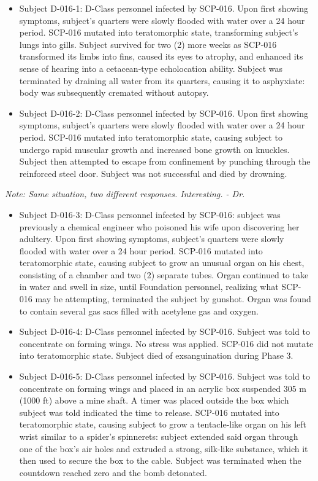 \begin{itemize}
\renewcommand{\labelitemi}{$\ast$}
\item Subject D-016-1: D-Class personnel infected by SCP-016. Upon first showing symptoms, subject's quarters were slowly flooded with water over a 24 hour period. SCP-016 mutated into teratomorphic state, transforming subject's lungs into gills. Subject survived for two (2) more weeks as SCP-016 transformed its limbs into fins, caused its eyes to atrophy, and enhanced its sense of hearing into a cetacean-type echolocation ability. Subject was terminated by draining all water from its quarters, causing it to asphyxiate: body was subsequently cremated without autopsy.
\item Subject D-016-2: D-Class personnel infected by SCP-016. Upon first showing symptoms, subject's quarters were slowly flooded with water over a 24 hour period. SCP-016 mutated into teratomorphic state, causing subject to undergo rapid muscular growth and increased bone growth on knuckles. Subject then attempted to escape from confinement by punching through the reinforced steel door. Subject was not successful and died by drowning.
\end{itemize}
\textsl{Note: Same situation, two different responses. Interesting. - Dr. }

\begin{itemize}
\renewcommand{\labelitemi}{$\ast$}
\item Subject D-016-3: D-Class personnel infected by SCP-016: subject was previously a chemical engineer who poisoned his wife upon discovering her adultery. Upon first showing symptoms, subject's quarters were slowly flooded with water over a 24 hour period. SCP-016 mutated into teratomorphic state, causing subject to grow an unusual organ on his chest, consisting of a chamber and two (2) separate tubes. Organ continued to take in water and swell in size, until Foundation personnel, realizing what SCP-016 may be attempting, terminated the subject by gunshot. Organ was found to contain several gas sacs filled with acetylene gas and oxygen.
\newpage
\item Subject D-016-4: D-Class personnel infected by SCP-016. Subject was told to concentrate on forming wings. No stress was applied. SCP-016 did not mutate into teratomorphic state. Subject died of exsanguination during Phase 3.
\item Subject D-016-5: D-Class personnel infected by SCP-016. Subject was told to concentrate on forming wings and placed in an acrylic box suspended 305 m (1000 ft) above a mine shaft. A timer was placed outside the box which subject was told indicated the time to release. SCP-016 mutated into teratomorphic state, causing subject to grow a tentacle-like organ on his left wrist similar to a spider's spinnerets: subject extended said organ through one of the box's air holes and extruded a strong, silk-like substance, which it then used to secure the box to the cable. Subject was terminated when the countdown reached zero and the bomb detonated.
\end{itemize}